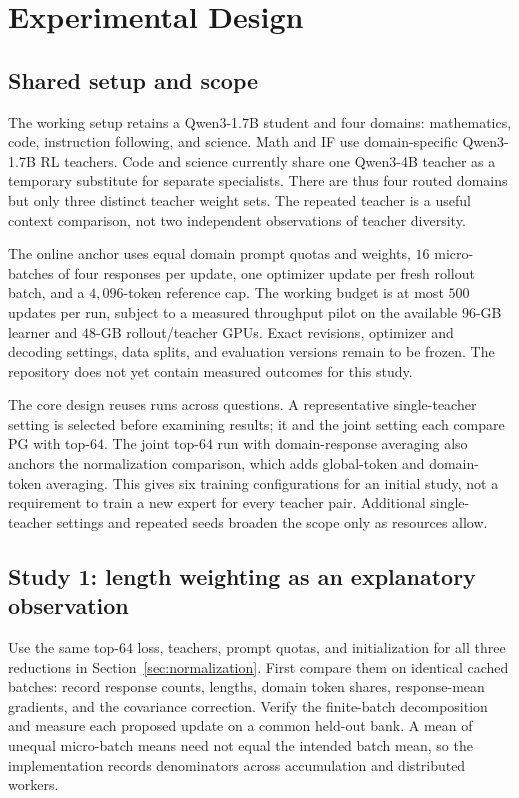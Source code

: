 \section{Experimental Design}
\label{sec:experiments}

\subsection{Shared setup and scope}

The working setup retains a Qwen3-1.7B student and four domains:
mathematics, code, instruction following, and science. Math and IF use
domain-specific Qwen3-1.7B RL teachers. Code and science currently share
one Qwen3-4B teacher as a temporary substitute for separate specialists.
There are thus four routed domains but only three distinct teacher
weight sets. The repeated teacher is a useful context comparison, not
two independent observations of teacher diversity.

The online anchor uses equal domain prompt quotas and weights,
$16$ micro-batches of four responses per update, one optimizer update
per fresh rollout batch, and a $4{,}096$-token reference cap.
The working budget is at most $500$ updates per run, subject to a measured
throughput pilot on the available $96$-GB learner and $48$-GB
rollout/teacher GPUs. Exact revisions, optimizer and decoding settings,
data splits, and evaluation versions remain to be frozen. The repository
does not yet contain measured outcomes for this study.

The core design reuses runs across questions. A representative
single-teacher setting is selected before examining results; it and the
joint setting each compare PG with top-$64$. The joint top-$64$ run with
domain-response averaging also anchors the normalization comparison,
which adds global-token and domain-token averaging. This gives six
training configurations for an initial study, not a requirement to
train a new expert for every teacher pair. Additional single-teacher
settings and repeated seeds broaden the scope only as resources allow.

\subsection{Study 1: length weighting as an explanatory observation}

Use the same top-$64$ loss, teachers, prompt quotas, and initialization
for all three reductions in Section~\ref{sec:normalization}.
First compare them on identical cached batches: record response counts,
lengths, domain token shares, response-mean gradients, and the covariance
correction. Verify the finite-batch decomposition and measure each
proposed update on a common held-out bank. A mean of unequal micro-batch
means need not equal the intended batch mean, so the implementation
records denominators across accumulation and distributed workers.

